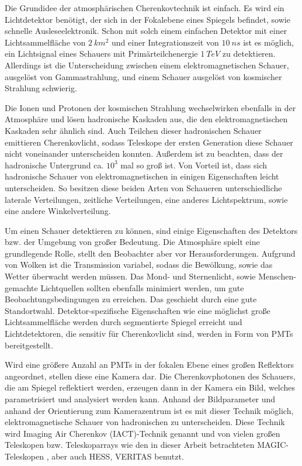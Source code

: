 Die Grundidee der atmosphärischen Cherenkovtechnik ist einfach.
Es wird ein Lichtdetektor benötigt, der sich in der Fokalebene eines Spiegels befindet, sowie schnelle Ausleseelektronik.
Schon mit solch einem einfachen Detektor mit einer Lichtsammelfläche von $\SI{2}{km^2}$ und einer Integrationszeit von $\SI{10}{ns}$ ist es möglich, ein Lichtsignal eines Schauers mit Primärteilchenergie $\SI{1}{TeV}$ zu detektieren.
Allerdings ist die Unterscheidung zwischen einem elektromagnetischen Schauer, ausgelöst von Gammastrahlung, und einem Schauer ausgelöst von kosmischer Strahlung schwierig.\cite{Weekes}

Die Ionen und Protonen der kosmischen Strahlung wechselwirken ebenfalls in der Atmosphäre und lösen hadronische Kaskaden aus, die den elektromagnetischen Kaskaden sehr ähnlich sind.
Auch Teilchen dieser hadronischen Schauer emittieren Cherenkovlicht, sodass Teleskope der ersten Generation diese Schauer nicht voneinander unterscheiden konnten.
Außerdem ist zu beachten, dass der hadronische Untergrund ca. $10^3$ mal so groß ist.
Von Vorteil ist, dass sich hadronische Schauer von elektromagnetischen in einigen Eigenschaften leicht unterscheiden.
So besitzen diese beiden Arten von Schaueren unterschiedliche laterale Verteilungen, zeitliche Verteilungen, eine anderes Lichtspektrum, sowie eine andere Winkelverteilung.\cite{Weekes}

Um einen Schauer detektieren zu können, sind einige Eigenschaften des Detektors bzw. der Umgebung von großer Bedeutung.
Die Atmosphäre spielt eine grundlegende Rolle, stellt den Beobachter aber vor Herausforderungen. 
Aufgrund von Wolken ist die Transmission variabel, sodass die Bewölkung, sowie das Wetter überwacht werden müssen.
Das Mond- und Sternenlicht, sowie Menschen-gemachte Lichtquellen sollten ebenfalls minimiert werden, um gute Beobachtungsbedingungen zu erreichen. 
Das geschieht durch eine gute Standortwahl.
Detektor-spezifische Eigenschaften wie eine möglichst große Lichtsammelfläche werden durch segmentierte Spiegel erreicht und Lichtdetektoren, die sensitiv für Cherenkovlicht sind, werden in Form von PMTs bereitgestellt.\cite{Weekes}

Wird eine größere Anzahl an PMTs in der fokalen Ebene eines großen Reflektors angeordnet, stellen diese eine Kamera dar.
Die Cherenkovphotonen des Schauers, die am Spiegel reflektiert werden, erzeugen dann in der Kamera ein Bild, welches parametrisiert und analysiert werden kann.
Anhand der Bildparameter und anhand der Orientierung zum Kamerazentrum ist es mit dieser Technik möglich, elektromagnetische Schauer von hadronischen zu unterscheiden.
Diese Technik wird Imaging Air Cherenkov (IACT)-Technik genannt und von vielen großen Teleskopen bzw. Teleskoparrays wie den in dieser Arbeit betrachteten MAGIC-Teleskopen \cite{MAGIC_Telescopes}, aber auch HESS\cite{HESS}, VERITAS\cite{VERITAS} benutzt.\cite{Weekes}

